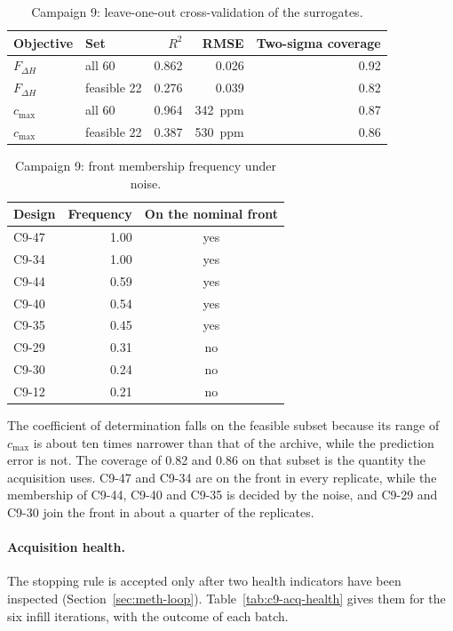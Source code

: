 \begin{table}[htbp]
  \centering
  \small
  \caption{Campaign 9: leave-one-out cross-validation of the surrogates.}
  \label{tab:c9-cv}
  \begin{tabular}{@{}llrrr@{}}
    \toprule
    Objective & Set & $R^2$ & RMSE & Two-sigma coverage \\
    \midrule
    $F_{\Delta H}$   & all 60      & 0.862 & 0.026 & 0.92 \\
    $F_{\Delta H}$   & feasible 22 & 0.276 & 0.039 & 0.82 \\
    $c_\mathrm{max}$ & all 60      & 0.964 & \SI{342}{ppm} & 0.87 \\
    $c_\mathrm{max}$ & feasible 22 & 0.387 & \SI{530}{ppm} & 0.86 \\
    \bottomrule
  \end{tabular}
\end{table}

\begin{table}[htbp]
  \centering
  \small
  \caption{Campaign 9: front membership frequency under noise.}
  \label{tab:c9-stability}
  \begin{tabular}{@{}lrc@{}}
    \toprule
    Design & Frequency & On the nominal front \\
    \midrule
    C9-47 & 1.00 & yes \\
    C9-34 & 1.00 & yes \\
    C9-44 & 0.59 & yes \\
    C9-40 & 0.54 & yes \\
    C9-35 & 0.45 & yes \\
    C9-29 & 0.31 & no \\
    C9-30 & 0.24 & no \\
    C9-12 & 0.21 & no \\
    \bottomrule
  \end{tabular}
\end{table}

The coefficient of determination falls on the feasible subset because
its range of $c_\mathrm{max}$ is about ten times narrower than that of
the archive, while the prediction error is not. The coverage of 0.82 and
0.86 on that subset is the quantity the acquisition uses. C9-47 and
C9-34 are on the front in every replicate, while the membership of
C9-44, C9-40 and C9-35 is decided by the noise, and C9-29 and C9-30 join
the front in about a quarter of the replicates.

\paragraph{Acquisition health.}
The stopping rule is accepted only after two health indicators have been
inspected (Section~\ref{sec:meth-loop}). Table~\ref{tab:c9-acq-health}
gives them for the six infill iterations, with the outcome of each
batch.

